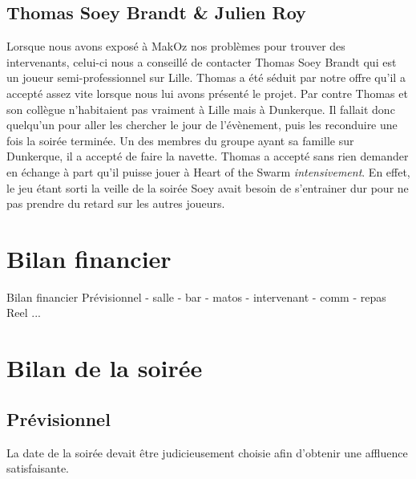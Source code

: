 \subsection{Thomas \og Soey \fg{} Brandt \& Julien Roy}%
\label{sub:thomas_soey_brandt_&_julien_roy}

Lorsque nous avons exposé à MakOz nos problèmes pour trouver des intervenants,
celui-ci nous a conseillé de contacter Thomas \og Soey \fg{} Brandt qui
est un joueur semi-professionnel sur Lille. Thomas a été séduit par
notre offre qu'il a accepté assez vite lorsque nous lui avons présenté
le projet. Par contre Thomas et son collègue n'habitaient pas vraiment à
Lille mais à Dunkerque. Il fallait donc quelqu'un pour aller les
chercher le jour de l'évènement, puis les reconduire une fois la soirée
terminée. Un des membres du groupe ayant sa famille sur Dunkerque, il a
accepté de faire la navette. Thomas a accepté sans rien demander en
échange à part qu'il puisse jouer à Heart of the Swarm
\emph{intensivement}.
En effet, le jeu étant sorti la veille de la soirée Soey avait besoin
de s'entrainer dur pour ne pas prendre du retard sur les autres joueurs.


\section{Bilan financier}%
\label{sec:bilan_financier}

Bilan financier
        Prévisionnel
            - salle
            - bar
            - matos
            - intervenant
            - comm
            - repas
        Reel
           ...

\section{Bilan de la soirée}%
\label{sec:Bilan_de_la_soiree}

\subsection{Prévisionnel}%
\label{sub:previsionnel}

La date de la soirée devait être judicieusement choisie afin d'obtenir une affluence satisfaisante.

